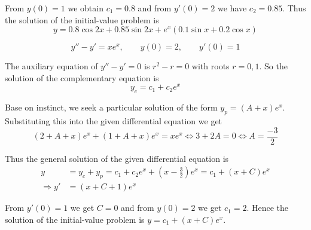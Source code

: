 \documentclass[a4paper,12pt]{article}
\begin{document}
From $y(0) = 1$ we obtain $c_1 = 0.8$ and from $y'(0) = 2$ we have $c_2 = 0.85$.
Thus the solution of the initial-value problem is
\[y = 0.8\cos 2x + 0.85\sin 2x + e^x(0.1\sin x + 0.2\cos x)\]

\[y'' - y' = xe^x,\qquad y(0) = 2,\qquad y'(0) = 1\tag{9}\]

The auxiliary equation of $y'' - y' = 0$ is $r^2 - r = 0$ with roots $r = 0, 1$.
So the solution of the complementary equation is
\[y_c = c_1 + c_2 e^x\]

Base on instinct, we seek a particular solution of the form $y_p = (A + x)e^x$.
Substituting this into the given differential equation we get
\[(2 + A + x)e^x + (1 + A + x)e^x = xe^x
\iff 3 + 2A = 0
\iff A = \frac{-3}{2}\]

Thus the general solution of the given differential equation is
\begin{align*}
y &= y_c + y_p
   = c_1 + c_2 e^x + \left(x - \frac{3}{2}\right)e^x
   = c_1 + (x + C)e^x\\
\Longrightarrow y' &= (x + C + 1)e^x
\end{align*}

From $y'(0) = 1$ we get $C = 0$ and from $y(0) = 2$ we get $c_1 = 2$.
Hence the solution of the initial-value problem is $y = c_1 + (x + C)e^x$.
\end{document}

